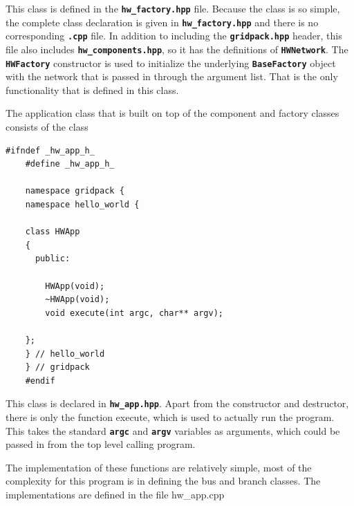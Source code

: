 \documentclass[12pt]{report} %
\begin{document}
This class is defined in the \texttt{\textbf{hw\_factory.hpp}} file. Because the class is so simple, the complete class declaration is given in \texttt{\textbf{hw\_factory.hpp}} and there is no corresponding \texttt{\textbf{.cpp}} file. In addition to including the \texttt{\textbf{gridpack.hpp}} header, this file also includes \texttt{\textbf{hw\_components.hpp}}, so it has the definitions of \texttt{\textbf{HWNetwork}}. The \texttt{\textbf{HWFactory}} constructor is used to initialize the underlying \texttt{\textbf{BaseFactory}} object with the network that is passed in through the argument list. That is the only functionality that is defined in this class.

The application class that is built on top of the component and factory classes consists of the class

{
\color{red}
\begin{Verbatim}[fontseries=b]
    #ifndef _hw_app_h_
    #define _hw_app_h_

    namespace gridpack {
    namespace hello_world {

    class HWApp
    {
      public:

        HWApp(void);
        ~HWApp(void);
        void execute(int argc, char** argv);

    };
    } // hello_world
    } // gridpack
    #endif
\end{Verbatim}
}

This class is declared in \texttt{\textbf{hw\_app.hpp}}. Apart from the constructor and destructor, there is only the function execute, which is used to actually run the program. This takes the standard \texttt{\textbf{argc}} and \texttt{\textbf{argv}} variables as arguments, which could be passed in from the top level calling program.

The implementation of these functions are relatively simple, most of the complexity for this program is in defining the bus and branch classes. The implementations are defined in the file hw\_app.cpp
\end{document}
